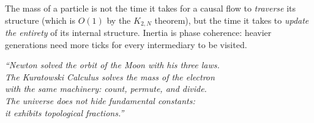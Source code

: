 \begin{result}[title={Dynamic mass $=$ topological inertia}]
The mass of a particle is not the time it takes for a causal flow to
\emph{traverse} its structure (which is $O(1)$ by the $K_{2,N}$
theorem), but the time it takes to \emph{update the entirety} of its
internal structure. Inertia is phase coherence: heavier generations need
more ticks for every intermediary to be visited.
\end{result}

\bigskip
\begin{center}
\large\itshape\color{structure}
``Newton solved the orbit of the Moon with his three laws.\\
The Kuratowski Calculus solves the mass of the electron\\
with the same machinery: count, permute, and divide.\\
The universe does not hide fundamental constants:\\
it exhibits topological fractions.''
\end{center}
